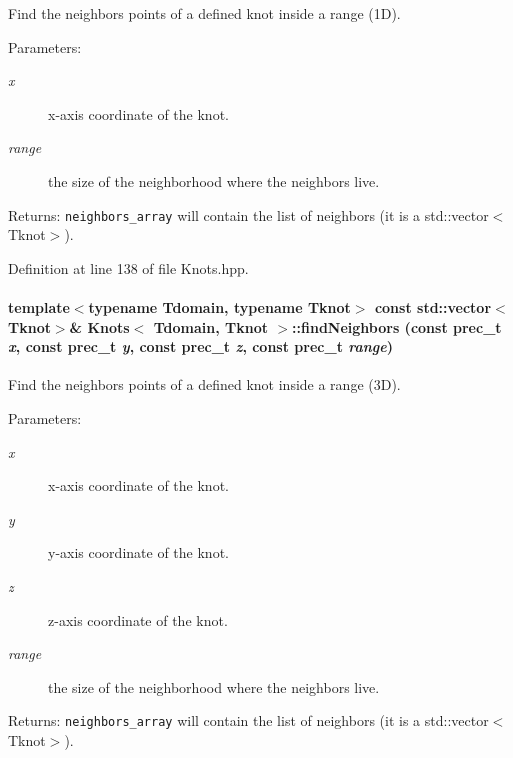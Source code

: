 Find the neighbors points of a defined knot inside a range (1D). 

\begin{Desc}
\item[Parameters:]
\begin{description}
\item[{\em x}]x-axis coordinate of the knot. \item[{\em range}]the size of the neighborhood where the neighbors live. \end{description}
\end{Desc}
\begin{Desc}
\item[Returns:]{\tt neighbors\_\-array} will contain the list of neighbors (it is a std::vector$<$Tknot$>$). \end{Desc}


Definition at line 138 of file Knots.hpp.\hypertarget{classKnots_b55324d1c79e72a5bb657639db26fed7}{
\paragraph[{findNeighbors}]{\setlength{\rightskip}{0pt plus 5cm}template$<$typename Tdomain, typename Tknot$>$ const std::vector$<$Tknot$>$\& {\bf Knots}$<$ Tdomain, Tknot $>$::findNeighbors (const {\bf prec\_\-t} {\em x}, \/  const {\bf prec\_\-t} {\em y}, \/  const {\bf prec\_\-t} {\em z}, \/  const {\bf prec\_\-t} {\em range})}\hfill}
\label{classKnots_b55324d1c79e72a5bb657639db26fed7}


Find the neighbors points of a defined knot inside a range (3D). 

\begin{Desc}
\item[Parameters:]
\begin{description}
\item[{\em x}]x-axis coordinate of the knot. \item[{\em y}]y-axis coordinate of the knot. \item[{\em z}]z-axis coordinate of the knot. \item[{\em range}]the size of the neighborhood where the neighbors live. \end{description}
\end{Desc}
\begin{Desc}
\item[Returns:]{\tt neighbors\_\-array} will contain the list of neighbors (it is a std::vector$<$Tknot$>$). \end{Desc}


